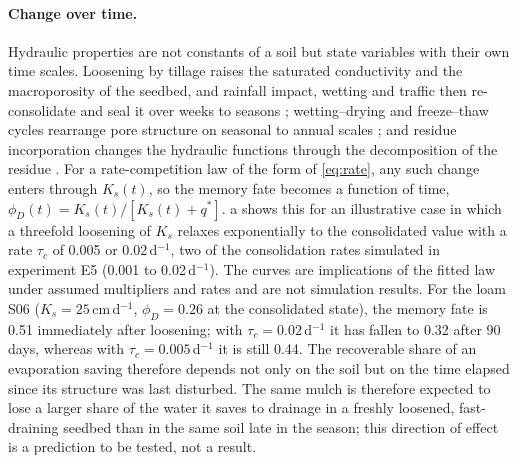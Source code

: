 \paragraph{Change over time.} Hydraulic properties are not constants of a soil but state variables with their own time scales. Loosening by tillage raises the saturated conductivity and the macroporosity of the seedbed, and rainfall impact, wetting and traffic then re-consolidate and seal it over weeks to seasons \citep{Hillel1998,Brady2016,Strudley2008}; wetting--drying and freeze--thaw cycles rearrange pore structure on seasonal to annual scales \citep{Leuther2021,MirandaVelez2023}; and residue incorporation changes the hydraulic functions through the decomposition of the residue \citep{Leuther2026}. For a rate-competition law of the form of \cref{eq:rate}, any such change enters through $K_s(t)$, so the memory fate becomes a function of time, $\phi_D(t)=K_s(t)/[K_s(t)+q^\ast]$. a shows this for an illustrative case in which a threefold loosening of $K_s$ relaxes exponentially to the consolidated value with a rate $\tau_c$ of 0.005 or 0.02\,d$^{-1}$, two of the consolidation rates simulated in experiment E5 (0.001 to 0.02\,d$^{-1}$). The curves are implications of the fitted law under assumed multipliers and rates and are not simulation results. For the loam S06 ($K_s=25$\,cm\,d$^{-1}$, $\phi_D=0.26$ at the consolidated state), the memory fate is 0.51 immediately after loosening; with $\tau_c=0.02$\,d$^{-1}$ it has fallen to 0.32 after 90 days, whereas with $\tau_c=0.005$\,d$^{-1}$ it is still 0.44. The recoverable share of an evaporation saving therefore depends not only on the soil but on the time elapsed since its structure was last disturbed. The same mulch is therefore expected to lose a larger share of the water it saves to drainage in a freshly loosened, fast-draining seedbed than in the same soil late in the season; this direction of effect is a prediction to be tested, not a result.

